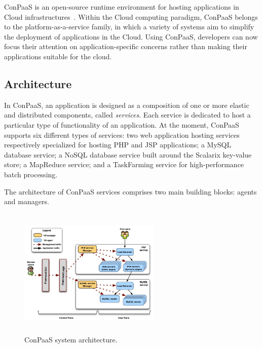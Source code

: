 

ConPaaS is an open-source runtime environment for hosting applications in Cloud infrastructures~\cite{conpaasIC}.
Within the Cloud computing paradigm, ConPaaS belongs to the platform-as-a-service family, 
in which a variety of systems aim to simplify the deployment of applications in the Cloud. Using ConPaaS,  developers can now focus their attention on application-specific concerns rather than making their applications suitable for the cloud. 

\subsection*{Architecture}

In ConPaaS, an application is designed as a composition of one or more elastic and distributed components, called \emph{services}. Each service is dedicated to host a particular type of functionality of an application. At the moment, ConPaaS supports six different types of services: two web application hosting services respectively specialized for hosting PHP and JSP applications; a MySQL database service; a NoSQL database service built around the Scalarix key-value store; a MapReduce service; and a TaskFarming service for high-performance batch processing.  

The architecture of ConPaaS services comprises two main building blocks: agents and managers.

\begin{figure}[Ht]
\begin{center}
\includegraphics[width=0.6\textwidth, height=6.2cm]{./images/conpaasSystemArch}
\end{center}
\caption{ConPaaS system architecture.}
\label{arch}
\end{figure}


